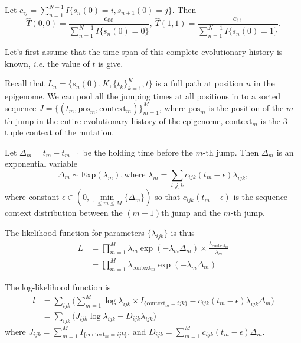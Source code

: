 \documentclass[11pt]{article}
\begin{document}
Let $c_{ij} = \sum_{n=1}^{N-1}I\{s_n(0) =i, s_{n+1}(0)=j\}$. Then
\[ \hat{T}(0, 0) = \frac{c_{00}}{\sum_{n=1}^{N-1}I\{s_n(0) = 0\}}, ~
\hat{T}(1,1) = \frac{c_{11}}{\sum_{n=1}^{N-1}I\{s_n(0) = 1\}}.
\]

Let's first assume that the time span of this complete evolutionary
history is known, \textit{i.e.} the value of $t$ is give.

Recall that $L_n = \{s_n(0), K, \{t_k\}_{k=1}^K, t\}$ is a full path
at position $n$ in the epigenome. We can pool all the jumping times at
all positions in to a sorted sequence $J = \{(t_m, \text{pos}_m,
\text{context}_m) \}_{m=1}^{M}$, where $\text{pos}_m$ is the position of the
$m$-th jump in the entire evolutionary history of the epigenome,
$\text{context}_m$ is the 3-tuple context of the mutation.

Let $\Delta_m = t_m - t_{m-1}$ be the holding time before the $m$-th
jump. Then $\Delta_m$ is an exponential variable
\[
\Delta_m \sim \text{Exp}(\lambda_m), \text{where } \lambda_m = \sum\limits_{i,j,k}c_{ijk}(t_m - \epsilon)\lambda_{ijk},
\]
where constant
$\epsilon \in (0, \min\limits_{1\le m \le M}\{\Delta_{m}\})$ so that
$c_{ijk}(t_m - \epsilon)$ is the sequence
context distribution between the $(m-1)$th jump and the $m$-th jump.

The likelihood function for parameters $\{\lambda_{ijk}\}$ is thus
\begin{equation}\label{eqn:lik}
\begin{aligned}
L &= \prod\limits_{m=1}^{M} \lambda_m \exp(-\lambda_m\Delta_m) \times \frac{\lambda_{\text{context}_m}}{\lambda_m} \\
&=\prod\limits_{m=1}^{M}\lambda_{\text{context}_m}\exp(-\lambda_m\Delta_m)
\end{aligned}
\end{equation}

The log-likelihood function is
\begin{equation}\label{eqn:loglik1}
\begin{aligned}
l & = \sum\limits_{ijk} \big(
\sum_{m=1}^M{\log\lambda_{ijk}\times I_{\{ \text{context}_m = ijk\}} - c_{ijk}(t_m-\epsilon)\lambda_{ijk}\Delta_m } \big) \\
& = \sum\limits_{ijk} \big(J_{ijk}\log\lambda_{ijk} - D_{ijk}\lambda_{ijk} \big)
\end{aligned}
\end{equation}
where $J_{ijk} = \sum_{m=1}^M I_{\{\text{context}_m = ijk\}}$, and $D_{ijk} = \sum_{m=1}^Mc_{ijk}(t_m-\epsilon)\Delta_m$.
\end{document}
